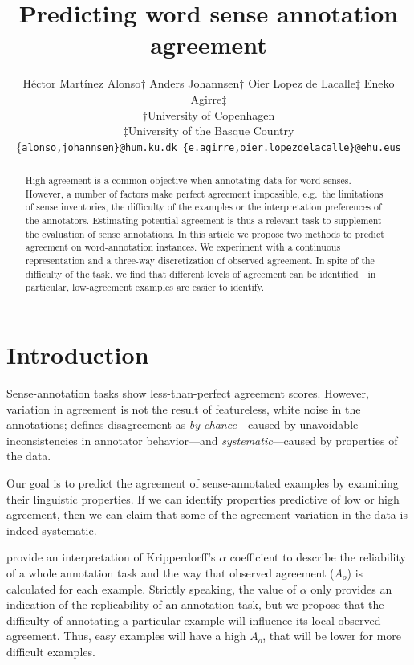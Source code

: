 \documentclass[11pt,a4paper]{article}
\title{Predicting word sense annotation agreement}
\author{Héctor Martínez Alonso$\dagger$ \quad Anders Johannsen$\dagger$ \quad Oier Lopez de Lacalle$\ddagger$ \quad Eneko Agirre$\ddagger$ \\
 $\dagger$University of Copenhagen \\ $\ddagger$University of the Basque Country \\
  {  {\normalsize \{{\tt alonso,johannsen\}@hum.ku.dk \{{\tt e.agirre,oier.lopezdelacalle\}@ehu.eus}}}} }
\date{}
\begin{document}
\maketitle
\begin{abstract}


High agreement is a common objective when annotating data for word senses.  
However, a number of factors make perfect agreement impossible, e.g.\ the limitations of sense inventories, the difficulty of the examples or the interpretation pre\-ferences of the annotators.
Estimating potential agreement is thus a relevant task to supplement the evaluation of sense annotations.
In this article we propose two methods to predict agreement on word-annotation instances. We experiment with a continuous representation and a three-way discretization of observed agreement. In spite of the difficulty of the task, we find that different levels of agreement can be identified---in particular, low-agreement examples are easier to identify.
\end{abstract}
\section{Introduction}

Sense-annotation tasks show less-than-perfect agreement scores. However, variation in agreement is not the result of featureless, white noise in the annotations;  defines disagreement as \textit{by chance}---caused by unavoidable inconsistencies in annotator behavior---and \textit{systematic}---caused by properties of the data.

Our goal is to predict the agreement of sense-annotated examples by examining their linguistic properties. If we can identify properties predictive of low or high agreement, then we can claim that some of the agreement variation in the data is indeed systematic. %



 provide an interpretation of Kripperdorff's $\alpha$ coefficient to describe the reliability of a whole annotation task and the way that observed agreement ($A_o$) is calculated for each example. Strictly speaking, the value of $\alpha$ only provides an indication of the replicability of an annotation task, but we propose that the difficulty of annotating a particular example will influence its local observed agreement. Thus, easy examples will have a high $A_o$, that will be lower for more difficult examples. 
\end{document}
